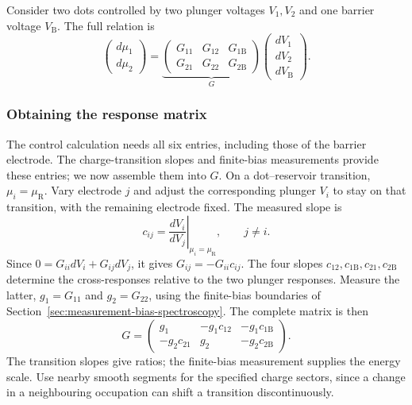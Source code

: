 Consider two dots controlled by two plunger voltages $V_1,V_2$
and one barrier voltage $V_{\mathrm B}$. The full relation is
\begin{equation}
 \begin{pmatrix}d\mu_1\\d\mu_2\end{pmatrix}
 =
 \underbrace{\begin{pmatrix}
 G_{11}&G_{12}&G_{1\mathrm B}\\
 G_{21}&G_{22}&G_{2\mathrm B}
 \end{pmatrix}}_{G}
 \begin{pmatrix}dV_1\\dV_2\\dV_{\mathrm B}\end{pmatrix}.
 \label{eq:calibration-full-gate-response}
\end{equation}

\subsubsection{Obtaining the response matrix}
The control calculation needs all six entries, including those of
the barrier electrode. The charge-transition slopes and
finite-bias measurements provide these entries;
we now assemble them into $G$. On a dot--reservoir transition,
$\mu_i=\mu_{\mathrm R}$. Vary electrode $j$ and adjust the
corresponding plunger $V_i$ to stay on that transition, with the
remaining electrode fixed. The measured slope is
\[
 c_{ij}=\left.\frac{dV_i}{dV_j}\right|_{\mu_i=\mu_{\mathrm R}},
 \qquad j\ne i.
\]
Since $0=G_{ii}dV_i+G_{ij}dV_j$, it gives
$G_{ij}=-G_{ii}c_{ij}$. The four slopes
$c_{12},c_{1\mathrm B},c_{21},c_{2\mathrm B}$ determine the
cross-responses relative to the two plunger responses.
Measure the latter,
$g_1=G_{11}$ and $g_2=G_{22}$, using the finite-bias boundaries
of Section~\ref{sec:measurement-bias-spectroscopy}.
The complete matrix is then
\begin{equation}
 G=\begin{pmatrix}
 g_1&-g_1c_{12}&-g_1c_{1\mathrm B}\\
 -g_2c_{21}&g_2&-g_2c_{2\mathrm B}
 \end{pmatrix}.
 \label{eq:calibration-matrix-from-lines}
\end{equation}
The transition slopes give ratios; the finite-bias measurement
supplies the energy scale. Use nearby smooth segments for the
specified charge sectors, since a change in a neighbouring
occupation can shift a transition discontinuously.

